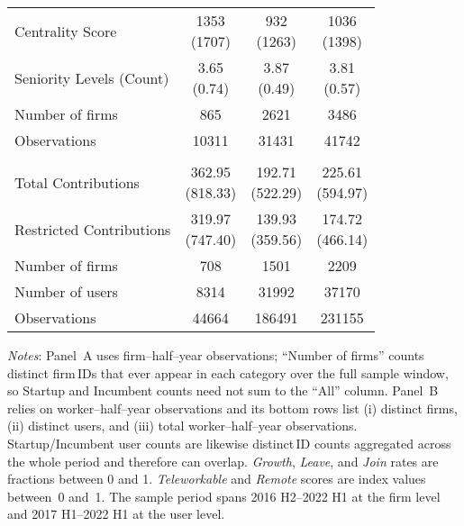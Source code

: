 \begin{table}[H]
\begin{threeparttable}
\begin{tabular}{lcc@{\hspace{6pt}}c}
Centrality Score & \makecell{1353 \\ (1707)} & \makecell{932 \\ (1263)} & \makecell{1036 \\ (1398)} \\
Seniority Levels (Count) & \makecell{3.65 \\ (0.74)} & \makecell{3.87 \\ (0.49)} & \makecell{3.81 \\ (0.57)} \\
\addlinespace
\midrule
Number of firms & 865 & 2621 & 3486 \\
Observations & 10311 & 31431 & 41742 \\
        \addlinespace
        \midrule
        \addlinespace
        \multicolumn{4}{l}{\textbf{\uline{Panel B: User-level}}}\\[0.3em]
        Total Contributions & \makecell{362.95 \\ (818.33)} & \makecell{192.71 \\ (522.29)} & \makecell{225.61 \\ (594.97)} \\
Restricted Contributions & \makecell{319.97 \\ (747.40)} & \makecell{139.93 \\ (359.56)} & \makecell{174.72 \\ (466.14)} \\
\addlinespace
\midrule
Number of firms & 708 & 1501 & 2209 \\
Number of users & 8314 & 31992 & 37170 \\
Observations & 44664 & 186491 & 231155 \\
        \bottomrule
        \end{tabular}
        \begin{tablenotes}[flushleft]
\footnotesize
\item \emph{Notes}: Panel~A uses firm--half--year observations; ``Number of firms'' counts distinct firm\,IDs that ever appear in each category over the full sample window, so Startup and Incumbent counts need not sum to the ``All'' column.  Panel~B relies on worker--half--year observations and its bottom rows list (i) distinct firms, (ii) distinct users, and (iii) total worker--half--year observations.  Startup/Incumbent user counts are likewise distinct\,ID counts aggregated across the whole period and therefore can overlap.  \textit{Growth}, \textit{Leave}, and \textit{Join} rates are fractions between 0 and 1. \textit{Teleworkable} and \textit{Remote} scores are index values between~0 and~1.  The sample period spans 2016 H2–2022 H1 at the firm level and 2017 H1–2022 H1 at the user level.
\end{tablenotes}
        \end{threeparttable}
        \end{table}
